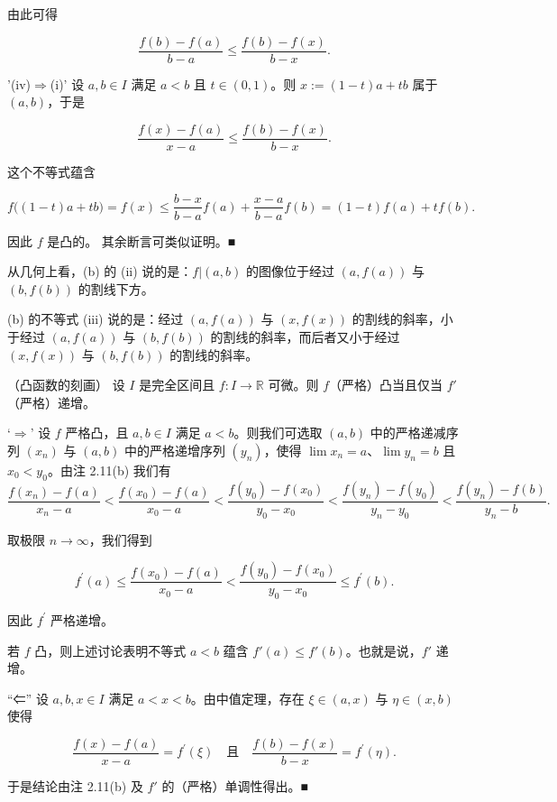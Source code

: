 \begin{remark}
\begin{items}
\begin{subitems}
由此可得

\[
\frac{f(b)-f(a)}{b-a}\leq\frac{f(b)-f(x)}{b-x}.
\]

'(iv)$\Rightarrow$(i)' 设 $ a, b \in I $ 满足 $ a < b $ 且 $ t \in (0,1) $。则 $ x := (1 - t)a + tb $ 属于 $ (a,b) $，于是

\[
\frac{f(x)-f(a)}{x-a}\leq\frac{f(b)-f(x)}{b-x}.
\]

这个不等式蕴含

\[
f\big((1-t)a+t b\big)=f(x)\leq\frac{b-x}{b-a}f(a)+\frac{x-a}{b-a}f(b)=(1-t)f(a)+t f(b).
\]

因此 $f$ 是凸的。
其余断言可类似证明。■

\end{subitems}

\item

从几何上看，(b) 的 (ii) 说的是：$f|(a,b)$ 的图像位于经过 $(a,f(a))$ 与 $(b,f(b))$ 的割线下方。

\end{items}

(b) 的不等式 (iii) 说的是：经过 $(a, f(a))$ 与 $(x, f(x))$ 的割线的斜率，小于经过 $(a, f(a))$ 与 $(b, f(b))$ 的割线的斜率，而后者又小于经过 $(x, f(x))$ 与 $(b, f(b))$ 的割线的斜率。

\end{remark}

\begin{theorem}

（凸函数的刻画） 设 $I$ 是完全区间且 $f: I \to \mathbb{R}$ 可微。则 $f$（严格）凸当且仅当 $f'$（严格）递增。


\proofhead
‘$\Rightarrow$’ 设 $f$ 严格凸，且 $a,b\in I$ 满足 $a<b$。则我们可选取 $(a,b)$ 中的严格递减序列 $(x_n)$ 与 $(a,b)$ 中的严格递增序列 $(y_n)$，使得 $\lim x_n=a$、$\lim y_n=b$ 且 $x_0<y_0$。由注 2.11(b) 我们有
\[
\frac{f(x_{n})-f(a)}{x_{n}-a}<\frac{f(x_{0})-f(a)}{x_{0}-a}<\frac{f(y_{0})-f(x_{0})}{y_{0}-x_{0}}<\frac{f(y_{n})-f(y_{0})}{y_{n}-y_{0}}<\frac{f(y_{n})-f(b)}{y_{n}-b}.
\]

取极限 $ n \to \infty $，我们得到

\[
f^{\prime}(a)\leq\frac{f(x_{0})-f(a)}{x_{0}-a}<\frac{f(y_{0})-f(x_{0})}{y_{0}-x_{0}}\leq f^{\prime}(b).
\]

因此 $ f^{\prime} $ 严格递增。

若 $f$ 凸，则上述讨论表明不等式 $a < b$ 蕴含 $f'(a) \leq f'(b)$。也就是说，$f'$ 递增。

“⇐” 设 $a,b,x \in I$ 满足 $a < x < b$。由中值定理，存在 $\xi \in (a,x)$ 与 $\eta \in (x,b)$ 使得

\[
\frac{f(x)-f(a)}{x-a}=f^{\prime}(\xi)\quad\text{且}\quad\frac{f(b)-f(x)}{b-x}=f^{\prime}(\eta).
\]

于是结论由注 2.11(b) 及 $ f' $ 的（严格）单调性得出。■

\end{theorem}

